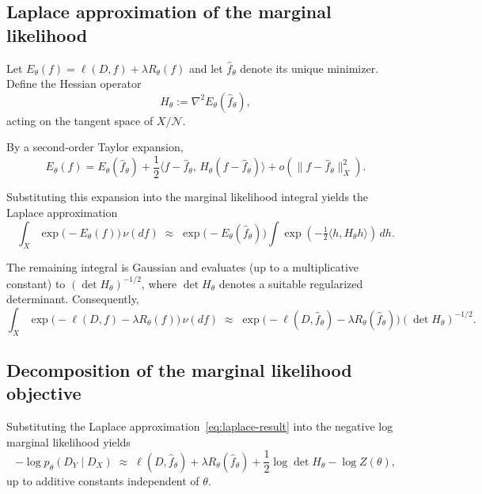 \subsection{Laplace approximation of the marginal likelihood}
\label{sec:laplace}

Let $E_\theta(f)=\ell(D,f)+\lambda R_\theta(f)$ and let
$\hat f_\theta$ denote its unique minimizer.
Define the Hessian operator
\[
	H_\theta := \nabla^2 E_\theta(\hat f_\theta),
\]
acting on the tangent space of $X/\mathcal N$.

By a second-order Taylor expansion,
\[
	E_\theta(f)
	=
	E_\theta(\hat f_\theta)
	+
	\frac{1}{2}
	\langle f-\hat f_\theta,\,
	H_\theta (f-\hat f_\theta)\rangle
	+
	o(\|f-\hat f_\theta\|_X^2).
\]

Substituting this expansion into the marginal likelihood integral yields
the Laplace approximation
\begin{equation}
	\label{eq:laplace-approx}
	\int_X
	\exp\!\big(-E_\theta(f)\big)\,\nu(df)
	\;\approx\;
	\exp\!\big(-E_\theta(\hat f_\theta)\big)
	\int
	\exp\!\left(
	-\tfrac{1}{2}
	\langle h, H_\theta h\rangle
	\right)\,dh.
\end{equation}

The remaining integral is Gaussian and evaluates (up to a multiplicative
constant) to $(\det H_\theta)^{-1/2}$, where $\det H_\theta$ denotes a suitable
regularized determinant. Consequently,
\begin{equation}
	\label{eq:laplace-result}
	\int_X
	\exp\!\big(-\ell(D,f)-\lambda R_\theta(f)\big)\,\nu(df)
	\;\approx\;
	\exp\!\big(-\ell(D,\hat f_\theta)-\lambda R_\theta(\hat f_\theta)\big)
	(\det H_\theta)^{-1/2}.
\end{equation}


\subsection{Decomposition of the marginal likelihood objective}
\label{sec:objective-decomposition}

Substituting the Laplace approximation~\eqref{eq:laplace-result} into the
negative log marginal likelihood yields
\begin{equation}
	\label{eq:laplace-objective}
	-\log p_\theta(D_Y\mid D_X)
	\;\approx\;
	\ell(D,\hat f_\theta)
	+
	\lambda R_\theta(\hat f_\theta)
	+
	\frac{1}{2}\log\det H_\theta
	-
	\log Z(\theta),
\end{equation}
up to additive constants independent of $\theta$.

